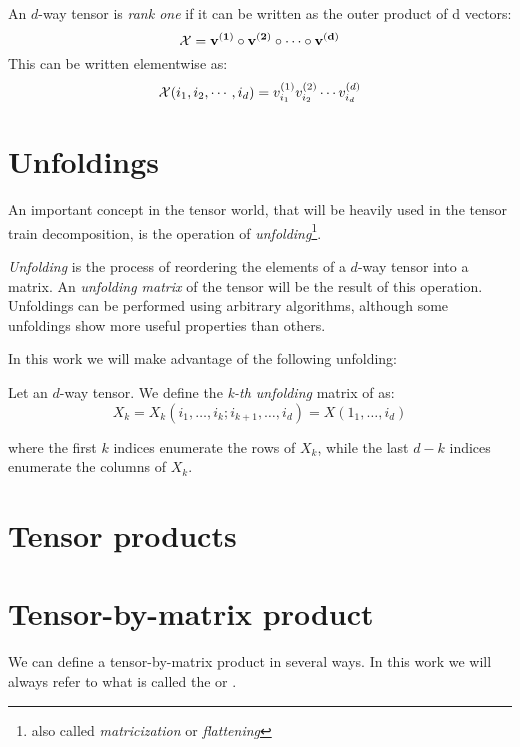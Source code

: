 
\begin{Def}
  An $d$-way tensor \X is \emph{rank one} if it can be written as the outer product of d vectors:
  \[
  \mathcal{X} = \mathbf{v^{(1)}} \circ \mathbf{v^{(2)}} \circ \cdots \circ \mathbf{v^{(d)}}
  \]
  This can be written elementwise as:
  \[
  \mathcal{X}(i_1,i_2,\cdots,i_d) = v_{i_1}^{(1)} v_{i_2}^{(2)} \cdots v_{i_d}^{(d)}
  \]
\end{Def}

\section{Unfoldings}
An important concept in the tensor world, that will be heavily used in the tensor train decomposition, is the operation of \emph{unfolding}\footnote{also called \emph{matricization} or \emph{flattening}}.

\emph{Unfolding} is the process of reordering the elements of a $d$-way tensor into a matrix. An \emph{unfolding matrix} of the tensor will be the result of this operation. Unfoldings can be performed using arbitrary algorithms, although some unfoldings show more useful properties than others.

In this work we will make advantage of the following unfolding:

\begin{Def}
  Let \X an $d$-way tensor. We define the \emph{k-th unfolding} matrix of \X as:
  \begin{equation} \label{def:unfolding}
    X_k = X_k(i_1,\dots,i_k;i_{k+1},\dots,i_d) = X(1_1,\dots,i_d)
  \end{equation}

where the first $k$ indices enumerate the rows of $X_k$, while the last $d - k$ indices enumerate the columns of $X_k$.
\end{Def}

\section{Tensor products}

\section{Tensor-by-matrix product}
We can define a tensor-by-matrix product in several ways. In this work we will always refer to what is called the  or .

